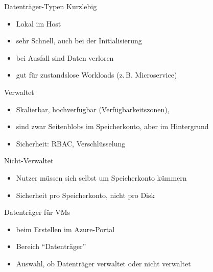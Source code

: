 \begin{flashcard}[Definition]{Datenträger-Typen}
    Kurzlebig
    \begin{itemize}
        \item Lokal im Host
        \item sehr Schnell, auch bei der Initialisierung
        \item bei Ausfall sind Daten verloren
        \item gut für zustandslose Workloads (z.\,B. Microservice)
    \end{itemize}
    Verwaltet
    \begin{itemize}
        \item Skalierbar, hochverfügbar (Verfügbarkeitszonen),
        \item sind zwar Seitenblobs im Speicherkonto, aber im Hintergrund
        \item Sicherheit: RBAC, Verschlüsselung
    \end{itemize}
    Nicht-Verwaltet
    \begin{itemize}
        \item Nutzer müssen sich selbst um Speicherkonto kümmern
        \item Sicherheit pro Speicherkonto, nicht pro Disk
    \end{itemize}
\end{flashcard}

\begin{flashcard}[Definition]{Datenträger für VMs}
    \begin{itemize}
        \item beim Erstellen im Azure-Portal
        \item Bereich ``Datenträger''
        \item Auswahl, ob Datenträger verwaltet oder nicht verwaltet
    \end{itemize}
\end{flashcard}


